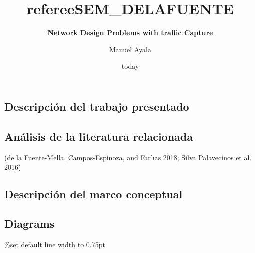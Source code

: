 \documentclass[
  british,
]{article}
\title{refereeSEM\_DELAFUENTE}
\subtitle{\textbf{Network Design Problems with traffic Capture}}
\author{Manuel Ayala}
\date{today}
\begin{document}
\maketitle

\hypertarget{descripciuxf3n-del-trabajo-presentado}{%
\subsection{Descripción del trabajo
presentado}\label{descripciuxf3n-del-trabajo-presentado}}

\hypertarget{anuxe1lisis-de-la-literatura-relacionada}{%
\subsection{Análisis de la literatura
relacionada}\label{anuxe1lisis-de-la-literatura-relacionada}}

(de la Fuente-Mella, Campos-Espinoza, and Far\a'ıas 2018; Silva
Palavecinos et al. 2016)

\hypertarget{descripciuxf3n-del-marco-conceptual}{%
\subsection{Descripción del marco
conceptual}\label{descripciuxf3n-del-marco-conceptual}}

\hypertarget{diagrams}{%
\subsection{Diagrams}\label{diagrams}}


\%set default line width to 0.75pt
\end{document}
